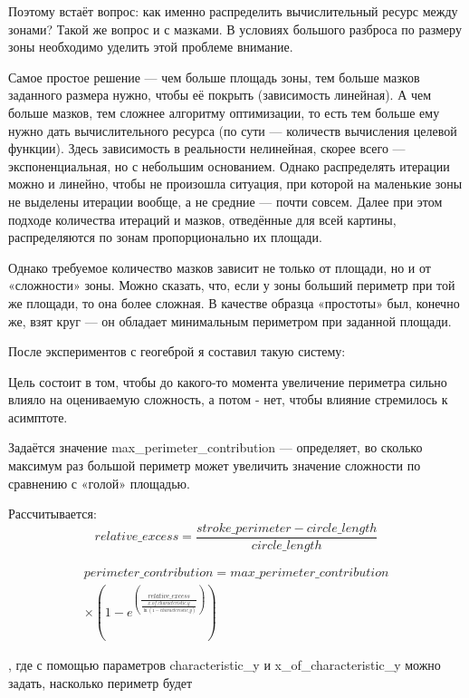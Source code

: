 Поэтому встаёт вопрос: как именно распределить вычислительный ресурс между зонами?
Такой же вопрос и с мазками.
В условиях большого разброса по размеру зоны необходимо уделить этой проблеме внимание.

Самое простое решение — чем больше площадь зоны, тем больше мазков заданного размера нужно,
чтобы её покрыть (зависимость линейная).
А чем больше мазков, тем сложнее алгоритму оптимизации, то есть тем больше ему нужно дать вычислительного ресурса
(по сути — количеств вычисления целевой функции).
Здесь зависимость в реальности нелинейная, скорее всего — экспоненциальная, но с небольшим основанием.
Однако распределять итерации можно и линейно, чтобы не произошла ситуация, при которой на маленькие зоны не выделены итерации вообще,
а не средние — почти совсем.
Далее при этом подходе количества итераций и мазков, отведённые для всей картины, распределяются по зонам пропорционально их площади.

Однако требуемое количество мазков зависит не только от площади, но и от «сложности» зоны.
Можно сказать, что, если у зоны больший периметр при той же площади, то она более сложная.
В качестве образца «простоты» был, конечно же, взят круг — он обладает минимальным периметром при заданной площади.

После экспериментов с геогеброй я составил такую систему:

Цель состоит в том, чтобы до какого-то момента увеличение периметра сильно влияло на оцениваемую сложность, а потом - нет, чтобы влияние стремилось к асимптоте.

Задаётся значение max\_perimeter\_contribution — определяет, во сколько максимум раз большой периметр может увеличить значение сложности по сравнению с «голой» площадью.

Рассчитывается:
\begin{equation}
    relative\_excess = \frac{stroke\_perimeter - circle\_length}{circle\_length}
\end{equation}

\begin{equation}
    \begin{gathered}
        perimeter\_contribution = max\_perimeter\_contribution \\
        \times \left(1 - e^\left(\frac{relative\_excess}{\frac{x\_of\_characteristic\_y}{\ln(1 - characteristic\_y)}} \right)\right)
    \end{gathered}
\end{equation}

, где с помощью параметров characteristic\_y и x\_of\_characteristic\_y можно задать, насколько периметр будет

